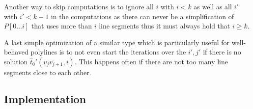 Another way to skip computations is to ignore all \(i\) with \(i < k\) as well as all \(i'\) with \(i' < k - 1\) in the computations as there can never be a simplification of \(P[0\dots i]\) that uses more than \(i\) line segments thus it must always hold that \(i \geq k\). 

A last simple optimization of a similar type which is particularly useful for well-behaved polylines is to not even start the iterations over the \(i', j'\) if there is no solution \(\hat t_0'(\overline{v_{j}v_{j+1}}, i)\). This happens often if there are not too many line segments close to each other.












\subsection{Implementation}
\label{subsec:implementation}
%


